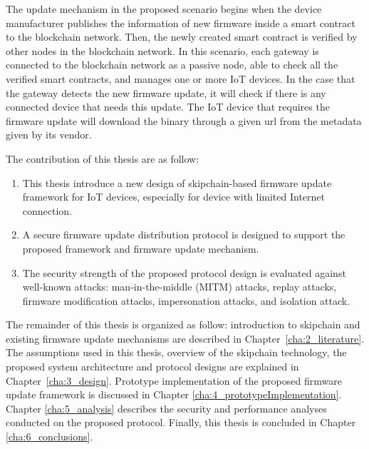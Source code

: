 The update mechanism in the proposed scenario begins when the device manufacturer publishes the information of new firmware inside a smart contract to the blockchain network. Then, the newly created smart contract is verified by other nodes in the blockchain network. In this scenario, each gateway is connected to the blockchain network as a passive node, able to check all the verified smart contracts, and manages one or more IoT devices. In the case that the gateway detects the new firmware update, it will check if there is any connected device that needs this update. The IoT device that requires the firmware update will download the binary through a given url from the metadata given by its vendor. 

The contribution of this thesis are as follow:\begin{enumerate}
	\item This thesis introduce a new design of skipchain-based firmware update framework for IoT devices, especially for device with limited Internet connection.
	\item A secure firmware update distribution protocol is designed to support the proposed framework and firmware update mechanism.
	\item The security strength of the proposed protocol design is evaluated against well-known attacks: man-in-the-middle (MITM) attacks, replay attacks, firmware modification attacks, impersonation attacks, and isolation attack.
\end{enumerate}

The remainder of this thesis is organized as follow: introduction to skipchain and existing firmware update mechanisms are described in Chapter~\ref{cha:2_literature}. The assumptions used in this thesis, overview of the skipchain technology, the proposed system architecture and protocol designs are explained in Chapter~\ref{cha:3_design}. Prototype implementation of the proposed firmware update framework is discussed in Chapter \ref{cha:4_prototypeImplementation}. Chapter \ref{cha:5_analysis} describes the security and performance analyses conducted on the proposed protocol. Finally, this thesis is concluded in Chapter \ref{cha:6_conclusions}.

